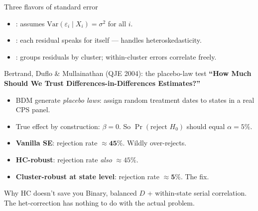 \documentclass[aspectratio=169,11pt]{beamer}
\begin{document}

\begin{frame}[shrink=8]{Three flavors of standard error}
\vspace{0.4em}
\begin{itemize}
  \item {}: assumes $\text{Var}(\varepsilon_i \mid X_i) = \sigma^2$ for all $i$.
  \item {}: each residual speaks for itself --- handles heteroskedasticity.
  \item {}: groups residuals by cluster; within-cluster errors correlate freely.
\end{itemize}
\vspace{0.6em}
\end{frame}

\begin{frame}{Bertrand, Duflo \& Mullainathan (QJE 2004): the placebo-law test}
\vspace{0.4em}
\textbf{``How Much Should We Trust Differences-in-Differences Estimates?''}
\vspace{0.4em}
\begin{itemize}\small
  \item BDM generate \textit{placebo laws}: assign random treatment dates to states in a real CPS panel.
  \item True effect by construction: $\beta = 0$. So $\Pr(\text{reject } H_0)$ should equal $\alpha = 5\%$.
  \item \textbf{Vanilla SE}: rejection rate $\approx \mathbf{45\%}$. Wildly over-rejects.
  \item \textbf{HC-robust}: rejection rate \textit{also} $\approx 45\%$. 
  \item \textbf{Cluster-robust at state level}: rejection rate $\approx \mathbf{5\%}$. \;The fix.
\end{itemize}
\vspace{0.4em}
\begin{block}{Why HC doesn't save you}
\small
Binary, balanced $D$ + within-state serial correlation. \;The het-correction has nothing to do with the actual problem. \;
\end{block}
\end{frame}
\end{document}
